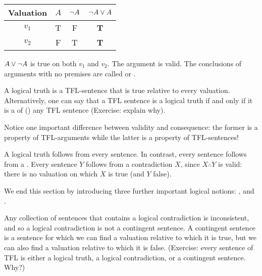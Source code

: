  \begin{center}
\begin{tabular}{c|c|c||c}
Valuation&$A$&$\neg A$&$\neg A\vee A$\\\hline
$v_1$&T & F & \textbf{T}\\
$v_2$&F & T & \textbf{T}
\end{tabular}
\end{center}

$A\vee\neg A$ is true on both $v_1$ and $v_2$. The argument is valid. The conclusions of arguments with no premises are called  or .


A logical truth is a TFL-sentence that is true relative to every valuation. Alternatively, one can say that a TFL sentence is a logical truth if and only if it is a  of () any TFL sentence (Exercise: explain why).


Notice one important  difference between validity and consequence: the former is a property of TFL-arguments while the latter is a property of TFL-sentences!

A logical truth follows from every sentence. In contrast, every sentence  follows from a .
Every sentence $Y$ follows from a contradiction $X$, since $X\therefore Y$ is valid: there is no valuation on which $X$ is true (and $Y$ false).

We end this section by introducing three further important logical notions: ,  and .

Any collection of sentences that contains a logical contradiction is inconsistent, and so a logical contradiction is not a contingent sentence. A contingent sentence is a sentence for which we can find a valuation relative to which it is true, but we can also find a valuation relative to which it is false. (Exercise: every sentence of TFL is either a logical truth, a logical contradiction, or a contingent sentence. Why?) 


